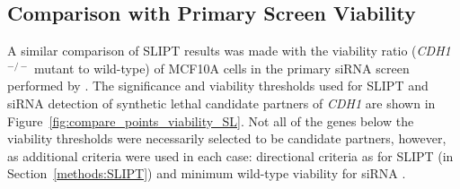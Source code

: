 \begin{table}[!htb]
\caption{\acrshort{ANOVA} for synthetic lethality and correlation with \textit{CDH1}}
\label{tab:compare_correlation_SL}
\noindent{}
\end{table} 

\FloatBarrier

\subsection{Comparison with Primary Screen Viability} \label{chapt3:compare_viability}

A similar comparison of \gls{SLIPT} results was made with the viability ratio (\textit{CDH1}$^{-/-}$ \gls{mutant} to \gls{wild-type}) of MCF10A cells in the primary \gls{siRNA} screen performed by \citet{Telford2015}. The significance and viability thresholds used for \gls{SLIPT} and \gls{siRNA} detection of \gls{synthetic lethal} candidate partners of \textit{CDH1} are shown in Figure~\ref{fig:compare_points_viability_SL}. Not all of the genes below the viability  thresholds were necessarily selected to be candidate partners, however, as additional criteria were used in each case: directional criteria as for \gls{SLIPT} (in Section~\ref{methods:SLIPT}) and minimum \gls{wild-type} viability for \gls{siRNA} \citep{Telford2015}.

